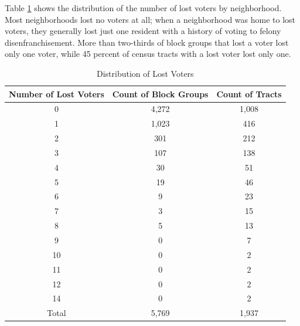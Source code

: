 \documentclass[]{article}
\begin{document}
Table \ref{tab:nhood-dist} shows the distribution of the number of lost voters by neighborhood. Most neighborhoods lost no voters at all; when a neighborhood was home to lost voters, they generally lost just one resident with a history of voting to felony disenfranchisement. More than two-thirds of block groups that lost a voter lost only one voter, while 45 percent of census tracts with a lost voter lost only one.

\begin{table}[H]

\caption{\label{tab:distribution-lost}\label{tab:nhood-dist} Distribution of Lost Voters}
\centering
\begin{tabular}{ccc}
\toprule
Number of Lost Voters & Count of Block Groups & Count of Tracts\\
\midrule
0 & 4,272 & 1,008\\
1 & 1,023 & 416\\
2 & 301 & 212\\
3 & 107 & 138\\
4 & 30 & 51\\
5 & 19 & 46\\
6 & 9 & 23\\
7 & 3 & 15\\
8 & 5 & 13\\
9 & 0 & 7\\
10 & 0 & 2\\
11 & 0 & 2\\
12 & 0 & 2\\
14 & 0 & 2\\
\hline
Total & 5,769 & 1,937\\
\bottomrule
\end{tabular}
\end{table}
\end{document}
